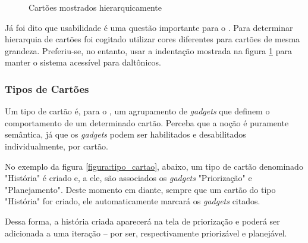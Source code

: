 \begin{figure}[H]
  \centering
  \caption{Cartões mostrados hierarquicamente}\label{figura:hierarquia}
\end{figure}

Já foi dito que usabilidade é uma questão importante para o \calopsita{}. Para determinar hierarquia de cartões foi cogitado utilizar cores diferentes para cartões de mesma grandeza. Preferiu-se, no entanto, usar a indentação mostrada na figura \ref{figura:hierarquia} para manter o sistema acessível para daltônicos.

\subsubsection*{Tipos de Cartões}

Um tipo de cartão é, para o \calopsita{}, um agrupamento de \textit{gadgets} que definem o comportamento de um determinado cartão. Perceba que a noção é puramente semântica, já que os \textit{gadgets} podem ser habilitados e desabilitados individualmente, por cartão.

No exemplo da figura \ref{figura:tipo_cartao}, abaixo, um tipo de cartão denominado "História" é criado e, a ele, são associados os \textit{gadgets} "Priorização" e "Planejamento". Deste momento em diante, sempre que um cartão do tipo "História" for criado, ele automaticamente marcará os \textit{gadgets} citados.

Dessa forma, a história criada aparecerá na tela de priorização e poderá ser adicionada a uma iteração -- por ser, respectivamente priorizável e planejável. 

